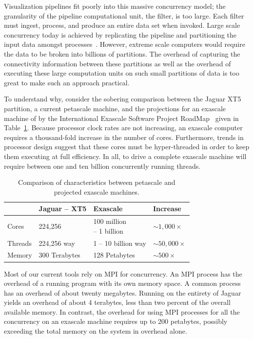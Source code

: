 \documentclass{vgtc}                          %
\newcommand*{\lcite}[1]{~\cite{#1}}
\begin{document}
Visualization pipelines fit poorly into this massive concurrency model; the
granularity of the pipeline computational unit, the filter, is too large.
Each filter must ingest, process, and produce an entire data set when
invoked.  Large scale concurrency today is achieved by replicating the
pipeline and partitioning the input data amongst processes\lcite{Ahrens00}.
However, extreme scale computers would require the data to be broken into
billions of partitions.  The overhead of capturing the connectivity
information between these partitions as well as the overhead of executing
these large computation units on such small partitions of data is too great
to make such an approach practical.

To understand why, consider the sobering comparison between the
Jaguar XT5 partition, a current petascale machine, and the projections for
an exascale machine of by the International Exascale Software Project
RoadMap\lcite{ExascaleRoadMap} given in Table~\ref{table:PetaExaCompare}.
Because processor clock rates are not increasing, an exascale computer
requires a thousand-fold increase in the number of cores.  Furthermore,
trends in processor design suggest that these cores must be hyper-threaded
in order to keep them executing at full efficiency.  In all, to drive a
complete exascale machine will require between one and ten billion
concurrently running threads.

\begin{table}[htbp]
  \centering
  \caption{Comparison of characteristics between petascale and projected
    exascale machines.}
  \label{table:PetaExaCompare}
  \begin{tabular}{llll}
    & Jaguar -- XT5 & Exascale & Increase \\
    \hline
    Cores & 224,256 & \parbox{.7in}{\vspace*{2pt}100 million\\ \hspace*{6pt} -- 1 billion\vspace*{2pt}} & $\sim{}1,000\times$ \\
    Threads & 224,256 way & 1 -- 10 billion way & $\sim{}50,000\times$ \\
    Memory & 300 Terabytes & 128 Petabytes & $\sim{}500\times$
  \end{tabular}
\end{table}

Most of our current tools rely on MPI for concurrency.  An MPI process has
the overhead of a running program with its own memory space.  A common
process has an overhead of about twenty megabytes.  Running on the entirety
of Jaguar yields an overhead of about 4 terabytes, less than two percent of
the overall available memory.  In contrast, the overhead for using MPI
processes for all the concurrency on an exascale machine requires up to 200
petabytes, possibly exceeding the total memory on the system in overhead
alone.
\end{document}
